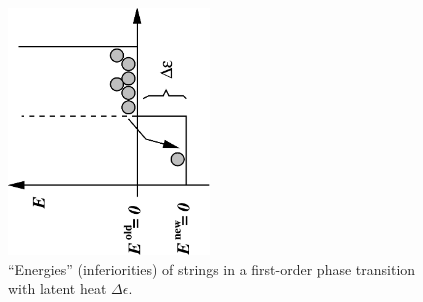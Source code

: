 \begin{figure}[t]
\begin{center}
\includegraphics[width=2.1in,angle=-90]{img/fig1}
\caption{``Energies'' (inferiorities) of strings in a first-order
  phase transition with latent heat $\Delta\epsilon$.}
\label{fig1}
\end{center}
\end{figure}

